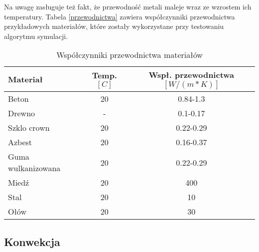 Na uwagę zasługuje też fakt, że przewodność metali maleje wraz ze wzrostem ich temperatury.
Tabela \ref {przewodnictwa} zawiera współczynniki przewodnictwa przykładowych materiałów, które zostały wykorzystane przy
testowaniu algorytmu symulacji.
\begin{table}

\begin {center}
\begin{tabular} {|l | c | c|}
\hline
Materiał & Temp. $[C]$ & Wspł. przewodnictwa $[W/(m*K)]$ \\ \hline
Beton & 20 & 0.84-1.3  \\ \hline
Drewno & - & 0.1-0.17  \\ \hline
Szklo crown & 20 & 0.22-0.29  \\ \hline
Azbest & 20 & 0.16-0.37 \\ \hline
Guma wulkanizowana & 20 & 0.22-0.29 \\ \hline
Miedź & 20 & 400 \\ \hline
Stal & 20 & 10 \\ \hline
Ołów & 20 & 30 \\ \hline
\hline
\end {tabular}
\caption{Współczynniki przewodnictwa materiałów}
\end{center}
\end {table}
\subsection{Konwekcja}


